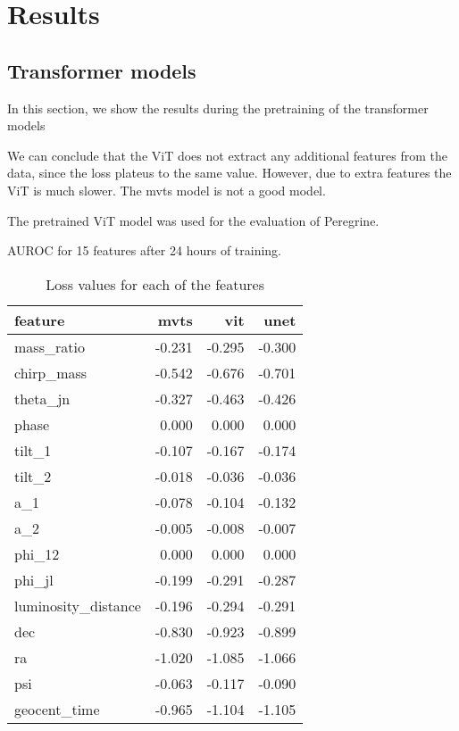 \section{Results}
\label{sec:results}

\subsection{Transformer models}

In this section, we show the results during the pretraining of the transformer models

We can conclude that the ViT does not extract any additional features from the data, since the loss plateus to the same value. However, due to extra features the ViT is much slower. The mvts model is not a good model.

The pretrained ViT model was used for the evaluation of Peregrine.

AUROC for 15 features after 24 hours of training.

\begin{table}
    \caption{Loss values for each of the features}
    \begin{tabular}{lrrr}
    \toprule
    feature & mvts & vit & unet \\
    \midrule
    mass_ratio & -0.231 & -0.295 & -0.300 \\
    chirp_mass & -0.542 & -0.676 & -0.701 \\
    theta_jn & -0.327 & -0.463 & -0.426 \\
    phase & 0.000 & 0.000 & 0.000 \\
    tilt_1 & -0.107 & -0.167 & -0.174 \\
    tilt_2 & -0.018 & -0.036 & -0.036 \\
    a_1 & -0.078 & -0.104 & -0.132 \\
    a_2 & -0.005 & -0.008 & -0.007 \\
    phi_12 & 0.000 & 0.000 & 0.000 \\
    phi_jl & -0.199 & -0.291 & -0.287 \\
    luminosity_distance & -0.196 & -0.294 & -0.291 \\
    dec & -0.830 & -0.923 & -0.899 \\
    ra & -1.020 & -1.085 & -1.066 \\
    psi & -0.063 & -0.117 & -0.090 \\
    geocent_time & -0.965 & -1.104 & -1.105 \\
    \bottomrule
    \end{tabular}
\end{table}

